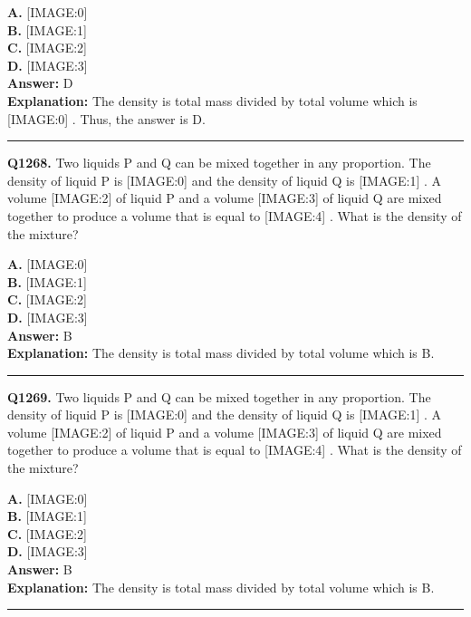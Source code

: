 \documentclass[12pt]{article}
\begin{document}
\textbf{A.} [IMAGE:0] \\
\textbf{B.} [IMAGE:1] \\
\textbf{C.} [IMAGE:2] \\
\textbf{D.} [IMAGE:3] \\

\textbf{Answer:} D \\
\textbf{Explanation:} The density is total mass divided by total volume which is
[IMAGE:0]
. Thus, the answer is D.

\hrule
\vspace{1em}


\noindent
\textbf{Q1268.} Two liquids P and Q can be mixed together in any proportion. The density of liquid P is
[IMAGE:0]
and the density of liquid Q is
[IMAGE:1]
. A volume
[IMAGE:2]
of liquid P and a volume
[IMAGE:3]
of liquid Q are mixed together to produce a volume that is equal to
[IMAGE:4]
. What is the density of the mixture?



\textbf{A.} [IMAGE:0] \\
\textbf{B.} [IMAGE:1] \\
\textbf{C.} [IMAGE:2] \\
\textbf{D.} [IMAGE:3] \\

\textbf{Answer:} B \\
\textbf{Explanation:} The density is total mass divided by total volume which is B.

\hrule
\vspace{1em}


\noindent
\textbf{Q1269.} Two liquids P and Q can be mixed together in any proportion. The density of liquid P is
[IMAGE:0]
and the density of liquid Q is
[IMAGE:1]
. A volume
[IMAGE:2]
of liquid P and a volume
[IMAGE:3]
of liquid Q are mixed together to produce a volume that is equal to
[IMAGE:4]
. What is the density of the mixture?



\textbf{A.} [IMAGE:0] \\
\textbf{B.} [IMAGE:1] \\
\textbf{C.} [IMAGE:2] \\
\textbf{D.} [IMAGE:3] \\

\textbf{Answer:} B \\
\textbf{Explanation:} The density is total mass divided by total volume which is B.

\hrule
\vspace{1em}
\end{document}
